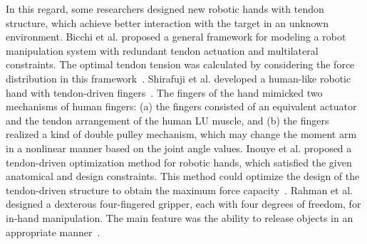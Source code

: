 \documentclass[journal,twoside,web]{ieeecolor}
\begin{document}
In this regard, some researchers designed new robotic hands with tendon structure, which achieve better interaction with the target in an unknown environment. 
Bicchi et al. proposed a general framework for modeling a robot manipulation system with redundant tendon actuation and multilateral constraints. The optimal tendon tension was calculated by considering the force distribution in this framework~\cite{Bicchi2000d}. 
Shirafuji et al. developed a human-like robotic hand with tendon-driven fingers~\cite{Shirafuji2014}. 
The fingers of the hand mimicked two mechanisms of human fingers: 
(a) the fingers consisted of an equivalent actuator and the tendon arrangement of the human LU muscle, and
(b) the fingers realized a kind of double pulley mechanism, which may change the moment arm in a nonlinear manner based on the joint angle values.
Inouye et al. proposed a tendon-driven optimization method for robotic hands, which satisfied the given anatomical and design constraints. This method could optimize the design of the tendon-driven structure to obtain the maximum force capacity~\cite{Joshua2014}. 
Rahman et al. designed a dexterous four-fingered gripper, each with four degrees of freedom, for in-hand manipulation. The main feature was the ability to release objects in an appropriate manner~\cite{Rahman2016}.
\end{document}
